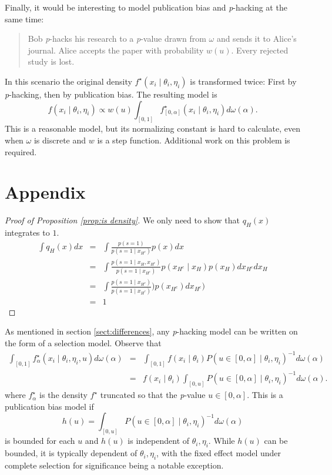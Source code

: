 \documentclass[useAMS,usenatbib,referee]{biom}
\begin{document}
Finally, it would be interesting to model publication bias and \textit{p}-hacking at the same time:
\begin{quote}
Bob \textit{p}-hacks his research to a \textit{p}-value drawn from $\omega$ and sends it to Alice's journal. Alice accepts the paper with probability $w(u)$. Every rejected study is lost.
\end{quote}
In this scenario the original density $f^{\star}(x_{i}\mid\theta_{i},\eta_{i})$ is transformed twice: First by \textit{p}-hacking, then by publication bias. The resulting model is $$f(x_{i}\mid\theta_{i},\eta_{i})\propto w(u)\int_{[0,1]}f_{[0,\alpha]}^{\star}(x_{i}\mid\theta_{i},\eta_{i})d\omega(\alpha).$$ This is a reasonable model, but its normalizing constant is hard to calculate, even when $\omega$ is discrete and $w$ is a step function. Additional work on this problem is required.

\section*{Appendix}
\begin{proof}[Proof of Proposition \ref{prop:is density}]
\label{proof:is density}
We only need to show that $q_{H}(x)$ integrates to $1$. \begin{eqnarray*}
\int q_{H}(x)dx & = & \int\frac{p(s=1)}{p(s=1\mid x_{H^{c}})}p(x)dx\\
 & = & \int\frac{p(s=1\mid x_{H},x_{H^{c}})}{p(s=1\mid x_{H^{c}})}p(x_{H^{c}}\mid x_{H})p(x_{H})dx_{H^{c}}dx_{H}\\
 & = & \int\frac{p(s=1\mid x_{H^{c}})}{p(s=1\mid x_{H^{c}})})p(x_{H^{c}})dx_{H^{c}})\\
 & = & 1
\end{eqnarray*}
\end{proof}
As mentioned in section \ref{sect:differences}, any \textit{p}-hacking model can be written on the form of a selection model. Observe that
\begin{eqnarray*}
\int_{[0,1]}f_\alpha^{\star}(x_{i}\mid\theta_{i},\eta_{i}, u)d\omega(\alpha) & = & \int_{[0,1]}f(x_{i}\mid\theta_{i})P(u\in\left[0,\alpha\right]\mid\theta_{i},\eta_{i})^{-1}d\omega(\alpha)\\
 & = & f(x_{i}\mid\theta_{i})\int_{[0,u]}P(u\in\left[0,\alpha\right]\mid\theta_{i},\eta_{i})^{-1}d\omega(\alpha).
\end{eqnarray*}
where $f_\alpha^{\star}$ is the density $f^{\star}$ truncated so that the \textit{p}-value $u\in\left[0,\alpha\right]$. This is a publication bias model if $$h(u)=\int_{[0,u]}P(u\in\left[0,\alpha\right]\mid\theta_{i},\eta_{i})^{-1}d\omega(\alpha)$$ is bounded for each $u$ and $h(u)$ is independent of $\theta_{i},\eta_{i}$. While $h(u)$ can be bounded, it is typically dependent of $\theta_{i},\eta_{i}$, with the fixed effect model under complete selection for significance being a notable exception.
\end{document}
